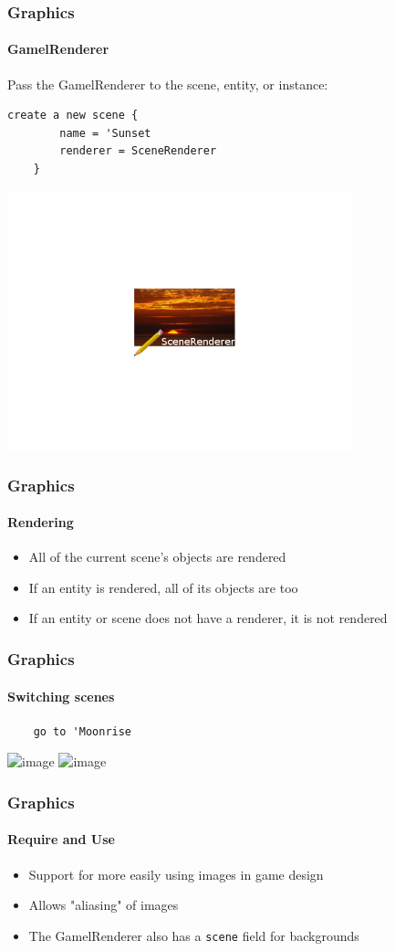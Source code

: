 \documentclass{beamer}
\begin{document}
\begin{frame}[fragile]
    \frametitle{Graphics}
    \framesubtitle{GamelRenderer}
    Pass the GamelRenderer to the scene, entity, or instance:
    \begin{lstlisting}[basicstyle=\small]
    create a new scene {
        name = 'Sunset
        renderer = SceneRenderer
    }
    \end{lstlisting}
    \includegraphics[width=10cm, trim= 4cm 4cm 4cm 4cm]{scene-render}
\end{frame}

\begin{frame}
    \frametitle{Graphics}
    \framesubtitle{Rendering}
    \begin{itemize}[<+->]
        \item{All of the current scene's objects are rendered}
        \item{If an entity is rendered, all of its objects are too}
        \item{If an entity or scene does not have a renderer, it is not rendered}
    \end{itemize}
\end{frame}

\begin{frame}[fragile]
    \frametitle{Graphics}
    \framesubtitle{Switching scenes}
    \begin{lstlisting}
    go to 'Moonrise
    \end{lstlisting}
    \includegraphics<1>[width=5cm]{scene}
    \includegraphics<2>[width=5cm]{transition}
\end{frame}

\begin{frame}
    \frametitle{Graphics}
    \framesubtitle{Require and Use}
    \begin{itemize}[<+->]
        \item{Support for more easily using images in game design}
        \item{Allows "aliasing" of images}
        \item{The GamelRenderer also has a \texttt{scene} field for backgrounds}
    \end{itemize}
\end{frame}
\end{document}
